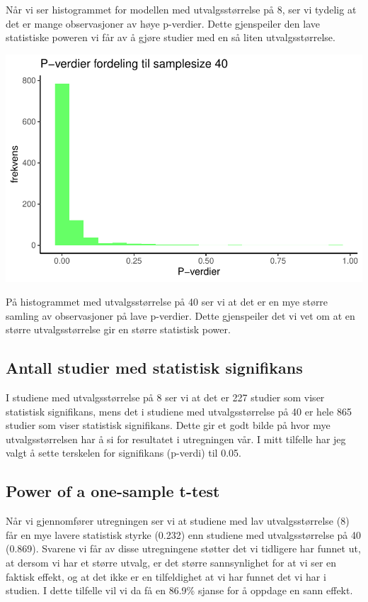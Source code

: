 \documentclass[
  letterpaper,
  DIV=11,
  numbers=noendperiod]{scrreprt}
\begin{document}
Når vi ser histogrammet for modellen med utvalgsstørrelse på 8, ser vi
tydelig at det er mange observasjoner av høye p-verdier. Dette
gjenspeiler den lave statistiske poweren vi får av å gjøre studier med
en så liten utvalgsstørrelse.

\includegraphics{03-statistical-inference_files/figure-pdf/P-verdi histogram SS40-1.pdf}

På histogrammet med utvalgsstørrelse på 40 ser vi at det er en mye
større samling av observasjoner på lave p-verdier. Dette gjenspeiler det
vi vet om at en større utvalgsstørrelse gir en større statistisk power.

\subsection{Antall studier med statistisk
signifikans}\label{antall-studier-med-statistisk-signifikans}

I studiene med utvalgsstørrelse på 8 ser vi at det er 227 studier som
viser statistisk signifikans, mens det i studiene med utvalgsstørrelse
på 40 er hele 865 studier som viser statistisk signifikans. Dette gir et
godt bilde på hvor mye utvalgsstørrelsen har å si for resultatet i
utregningen vår. I mitt tilfelle har jeg valgt å sette terskelen for
signifikans (p-verdi) til 0.05.

\subsection{Power of a one-sample
t-test}\label{power-of-a-one-sample-t-test}

Når vi gjennomfører utregningen ser vi at studiene med lav
utvalgsstørrelse (8) får en mye lavere statistisk styrke (0.232) enn
studiene med utvalgsstørrelse på 40 (0.869). Svarene vi får av disse
utregningene støtter det vi tidligere har funnet ut, at dersom vi har et
større utvalg, er det større sannsynlighet for at vi ser en faktisk
effekt, og at det ikke er en tilfeldighet at vi har funnet det vi har i
studien. I dette tilfelle vil vi da få en 86.9\% sjanse for å oppdage en
sann effekt.
\end{document}

